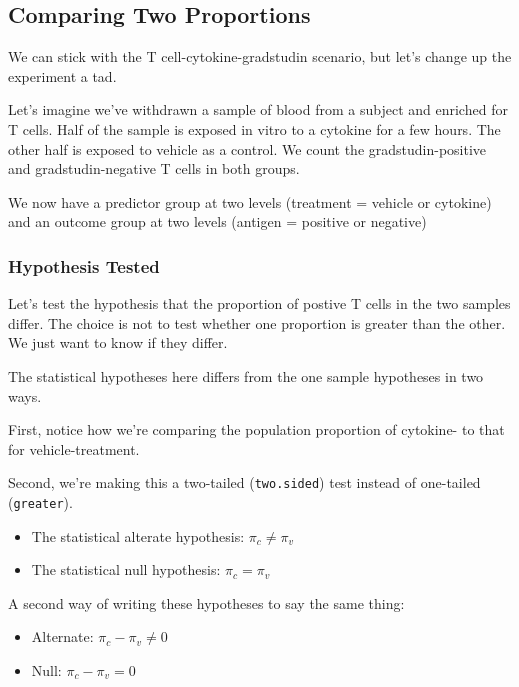 \documentclass[]{book}
\begin{document}
\hypertarget{comparing-two-proportions}{%
\subsection{Comparing Two Proportions}\label{comparing-two-proportions}}

We can stick with the T cell-cytokine-gradstudin scenario, but let's change up the experiment a tad.

Let's imagine we've withdrawn a sample of blood from a subject and enriched for T cells. Half of the sample is exposed in vitro to a cytokine for a few hours. The other half is exposed to vehicle as a control. We count the gradstudin-positive and gradstudin-negative T cells in both groups.

We now have a predictor group at two levels (treatment = vehicle or cytokine) and an outcome group at two levels (antigen = positive or negative)

\hypertarget{hypothesis-tested}{%
\subsubsection{Hypothesis Tested}\label{hypothesis-tested}}

Let's test the hypothesis that the proportion of postive T cells in the two samples differ. The choice is not to test whether one proportion is greater than the other. We just want to know if they differ.

The statistical hypotheses here differs from the one sample hypotheses in two ways.

First, notice how we're comparing the population proportion of cytokine- to that for vehicle-treatment.

Second, we're making this a two-tailed (\texttt{two.sided}) test instead of one-tailed (\texttt{greater}).

\begin{itemize}
\item
  The statistical alterate hypothesis: \(\pi_c\ne\pi_v\)
\item
  The statistical null hypothesis: \(\pi_c=\pi_v\)
\end{itemize}

A second way of writing these hypotheses to say the same thing:

\begin{itemize}
\item
  Alternate: \(\pi_c-\pi_v\ne0\)
\item
  Null: \(\pi_c-\pi_v=0\)
\end{itemize}
\end{document}
